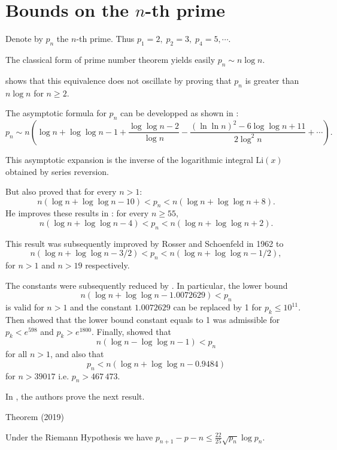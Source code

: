 \par 


\section{Bounds on the $n$-th prime}



Denote by $p_n$  the $n$-th prime. Thus $p_1=2,\;p_2=3,\; p_4=5,\cdots$.

The classical form of prime number theorem yields easily
$p_n \sim n \log n.$ 

\cite{Rosser*38}
shows that this equivalence does not oscillate
by proving that $p_n$ is greater than $n\log n$ for $n\geq 2$.  


The asymptotic formula for $p_n$ can be developped as shown in
\cite{Cipolla*02}:
$$
p_n\sim n\left(\log n+\log\log n -1+\frac{\log\log n-2}{\log n}
-\frac{(\ln\ln n)^2-6\log\log n +11}{2\log^2 n}+\cdots\right).
$$

This asymptotic expansion is the inverse of the logarithmic integral
$\mbox{Li}(x)$ obtained by series reversion. 


 But
\cite{Rosser*38}
also proved  that for every $n> 1$:
$$
n (\log n + \log \log n - 10) < p_n < n (\log n + \log\log n +8).
$$
He improves these results in
\cite{Rosser*41}
:  for every $n\geq 55$,
$$
n (\log n + \log \log n - 4) < p_n < n (\log n + \log\log n +2).
$$

 This result was subsequently improved by Rosser and Schoenfeld
\cite{Rosser-Schoenfeld*62}
 in 1962 to
$$
n (\log n + \log \log n - 3/2) < p_n < n (\log n + \log\log n -1/2),
$$
for $n > 1$ and $n > 19$  respectively.

The constants  were subsequently reduced by
\cite{Robin*83-1}.
In particular, the lower bound 
$$
n (\log n + \log \log n - 1.0072629) < p_n
$$
is valid for $n>1$ and the constant $1.0072629$ can be replaced by 1 for
$p_k\leq 10^{11}$.
Then 
\cite{Massias-Robin*96}
  showed that the lower bound constant equals to 1 was admissible for
$p_k < e^{598}$
and $p_k > e^{1800}$. Finally,  
\cite{Dusart*99-2}
showed
that
$$
  n(\log n - \log \log n - 1) < p_n
$$ for all $n > 1$, and also that
$$
p_n < n (\log n + \log\log n - 0.9484)
$$ for $n > 39017$ i.e. $p_n > 467\,473$.

In \cite{Carneiro-Milinovich-Soundararajan*19}, the authors  prove the next result.
\begin{thm}{Theorem (2019)}

Under the Riemann Hypothesis we have $p_{n+1}-p-n\le\frac{22}{25}\sqrt{p_n}\log p_n$.
\end{thm}




